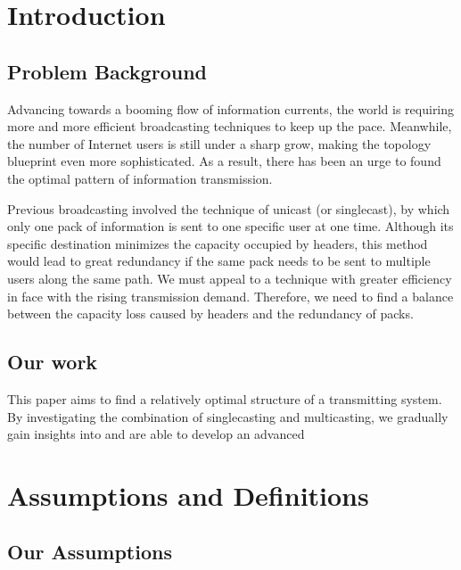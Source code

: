 \documentclass{mcmthesis}
\begin{document}
\maketitle

\tableofcontents
\newpage

\section{Introduction}

\subsection{Problem Background}

Advancing towards a booming flow of information currents, the world is requiring more and more efficient broadcasting techniques to keep up the pace. Meanwhile, the number of Internet users is still under a sharp grow, making the topology blueprint even more sophisticated. As a result, there has been an urge to found the optimal pattern of information transmission.

Previous broadcasting involved the technique of unicast (or singlecast), by which only one pack of information is sent to one specific user at one time. Although its specific destination minimizes the capacity occupied by headers, this method would lead to great redundancy if the same pack needs to be sent to multiple users along the same path. We must appeal to a technique with greater efficiency in face with the rising transmission demand. Therefore, we need to find a balance between the capacity loss caused by headers and the redundancy of packs.

\subsection{Our work}
This paper aims to find a relatively optimal structure of a transmitting system. By investigating the combination of singlecasting and multicasting, we gradually gain insights into  and are able to develop an advanced

\section{Assumptions and Definitions}
\subsection{Our Assumptions}
\end{document}
